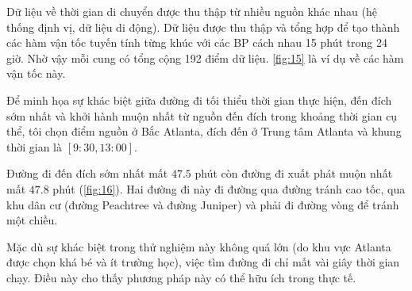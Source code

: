 \documentclass[../main.tex]{subfiles}
\begin{document}
Dữ liệu về thời gian di chuyển được thu thập từ nhiều nguồn khác nhau
(hệ thống định vị, dữ liệu di động). Dữ liệu được thu thập và tổng hợp
để tạo thành các hàm vận tốc tuyến tính từng khúc với các BP
cách nhau 15 phút trong 24 giờ. Nhờ vậy mỗi cung có tổng cộng 192 điểm
dữ liệu. \autoref{fig:15} là ví dụ về các hàm vận tốc
này.


Để minh họa sự khác biệt giữa đường đi tối thiểu thời gian thực hiện,
đến đích sớm nhất và khởi hành muộn nhất từ nguồn đến đích trong khoảng
thời gian cụ thể, tôi chọn điểm nguồn ở Bắc Atlanta, đích đến ở Trung
tâm Atlanta và khung thời gian là \([9:30, 13:00]\).


Đường đi đến đích sớm nhất mất \(47.5\) phút còn đường đi xuất
phát muộn nhất mất \(47.8\) phút (\autoref{fig:16}). Hai đường đi này đi đường qua đường 
tránh cao tốc, qua khu dân cư (đường Peachtree và đường Juniper) và phải đi đường vòng
để tránh một chiều.

Mặc dù sự khác biệt trong thử nghiệm này không quá lớn (do khu vực
Atlanta được chọn khá bé và ít trường học), việc tìm đường đi chỉ mất
vài giây thời gian chạy. Điều này cho thấy phương pháp này có thể hữu
ích trong thực tế.

\end{document}
